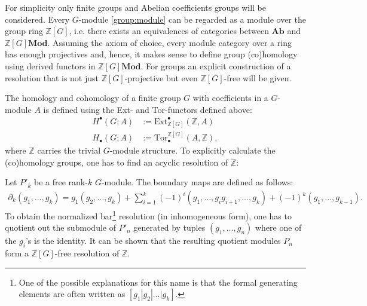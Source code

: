 	For simplicity only finite groups and Abelian coefficients groups will be considered. Every $G$-module \ref{group:module} can be regarded as a module over the group ring $\mathbb{Z}[G]$, i.e. there exists an equivalences of categories between $\mathbf{Ab}$ and $\mathbb{Z}[G]\mathbf{Mod}$. Assuming the axiom of choice, every module category over a ring has enough projectives and, hence, it makes sense to define group (co)homology using derived functors in $\mathbb{Z}[G]\mathbf{Mod}$. For groups an explicit construction of a resolution that is not just $\mathbb{Z}[G]$-projective but even $\mathbb{Z}[G]$-free will be given.

	The homology and cohomology of a finite group $G$ with coefficients in a $G$-module $A$ is defined using the Ext- and Tor-functors defined above:
	\begin{align}
		H^\bullet(G; A) &:= \text{Ext}_{\mathbb{Z}[G]}^\bullet(\mathbb{Z}, A)\\
		H_\bullet(G; A) &:= \text{Tor}^{\mathbb{Z}[G]}_\bullet(A, \mathbb{Z}),
	\end{align}
	where $\mathbb{Z}$ carries the trivial $G$-module structure. To explicitly calculate the (co)homology groups, one has to find an acyclic resolution of $\mathbb{Z}$:
	\begin{construct}
		Let $P'_k$ be a free rank-$k$ $G$-module. The boundary maps are defined as follows:
		\begin{gather}
			\label{homalg:group_boundary}
			\partial_k(g_1,\ldots,g_k) = g_1(g_2,\ldots,g_k) + \sum_{i=1}^k (-1)^i(g_1,\ldots,g_ig_{i+1},\ldots,g_k) + (-1)^k (g_1,\ldots,g_{k-1}).
		\end{gather}
		To obtain the normalized bar\footnote{One of the possible explanations for this name is that the formal generating elements are often written as $[g_1|g_2|\ldots|g_k]$.} resolution (in inhomogeneous form), one has to quotient out the submodule of $P'_n$ generated by tuples $(g_1,\ldots,g_n)$ where one of the $g_i$'s is the identity. It can be shown that the resulting quotient modules $P_n$ form a $\mathbb{Z}[G]$-free resolution of $\mathbb{Z}$.
	\end{construct}


